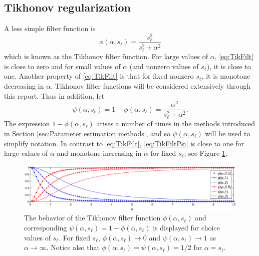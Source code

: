 \documentclass[12pt]{article}
\newcommand{\regparam}{\alpha}
\newcommand{\filt}{\phi}
\newcommand{\mfilt}{\psi}
\newcommand{\singular}{s}	%
\begin{document}
\subsection{Tikhonov regularization} \label{sec:Tikhonov reg.}

A less simple filter function is
\begin{equation}
\filt(\regparam,\singular_\ell)  = \frac{\singular_\ell^2}{\singular_\ell^2 + \regparam^2}
\label{eq:TikFilt}
\end{equation}
which is known as the Tikhonov filter function. For large values of $\regparam$, \eqref{eq:TikFilt} is close to zero and for small values of $\regparam$ (and nonzero values of $\singular_\ell$), it is close to one. Another property of \eqref{eq:TikFilt} is that for fixed nonzero $\singular_\ell$, it is monotone decreasing in $\regparam$. Tikhonov filter functions will be considered extensively through this report. Thus in addition, let
\begin{equation}
\mfilt(\regparam,\singular_\ell) = 1 - \filt(\regparam,\singular_\ell) = \frac{\regparam^2}{\singular_\ell^2 + \regparam^2}.
\label{eq:TikFiltPsi}
\end{equation}
The expression $1 - \filt(\regparam,\singular_\ell)$ arises a number of times in the methods introduced in Section \ref{sec:Parameter estimation methods}, and so $\mfilt(\regparam,\singular_\ell)$ will be used to simplify notation. In contrast to \eqref{eq:TikFilt}, \eqref{eq:TikFiltPsi} is close to one for large values of $\regparam$ and monotone increasing in $\regparam$ for fixed $\singular_\ell$; see Figure \ref{fig:Phi Psi Plot}. \par 

\begin{figure}
	\centerline{\includegraphics[scale = 0.4]{Figures/Phi_Psi_Plot.eps}}
\caption{The behavior of the Tikhonov filter function $\filt(\regparam,\singular_\ell)$ and corresponding $\mfilt(\regparam,\singular_\ell) = 1 - \filt(\regparam,\singular_\ell)$ is displayed for choice values of $\singular_\ell$. For fixed $\singular_\ell$, $\filt(\regparam,\singular_\ell) \rightarrow 0$ and $\mfilt(\regparam,\singular_\ell) \rightarrow 1$ as $\regparam \rightarrow \infty$. Notice also that $\filt(\regparam,\singular_\ell) = \mfilt(\regparam,\singular_\ell) = 1/2$ for $\alpha = \singular_\ell$.}
\label{fig:Phi Psi Plot}
\end{figure}
\end{document}
